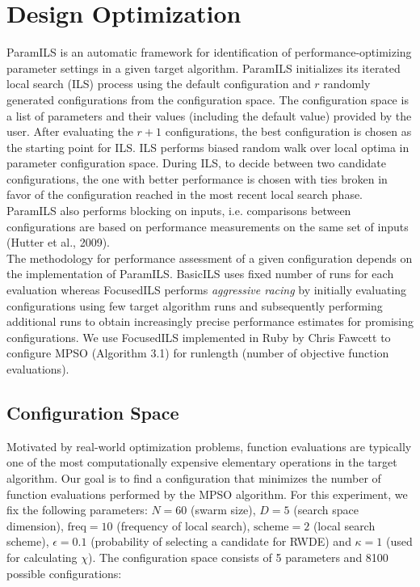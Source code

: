 \section{Design Optimization}

ParamILS is an automatic framework for identification of performance-optimizing parameter settings in a given target algorithm. ParamILS initializes its iterated local search (ILS) process using the default configuration and $r$ randomly generated configurations from the configuration space. The configuration space is a list of parameters and their values (including the default value) provided by the user. After evaluating the $r+1$ configurations, the best configuration is chosen as the starting point for ILS. ILS performs biased random walk over local optima in parameter configuration space. During ILS, to decide between two candidate configurations, the one with better performance is chosen with ties broken in favor of the configuration reached in the most recent local search phase. ParamILS also performs blocking on inputs, i.e. comparisons between configurations are based on performance measurements on the same set of inputs (Hutter et al., 2009).\\

The methodology for performance assessment of a given configuration depends on the implementation of ParamILS. BasicILS uses fixed number of runs for each evaluation whereas FocusedILS performs {\it aggressive racing} by initially evaluating configurations using few target algorithm runs and subsequently performing additional runs to obtain increasingly precise performance estimates for promising configurations. We use FocusedILS implemented in Ruby by Chris Fawcett to configure MPSO (Algorithm 3.1) for runlength (number of objective function evaluations).

\subsection{Configuration Space}

Motivated by real-world optimization problems, function evaluations are typically one of the most computationally expensive elementary operations in the target algorithm. Our goal is to find a configuration that minimizes the number of function evaluations performed by the MPSO algorithm. For this experiment, we fix the following parameters: $N=60$ (swarm size), $D=5$ (search space dimension), $\text{freq}=10$ (frequency of local search), $\text{scheme}=2$ (local search scheme), $\epsilon=0.1$ (probability of selecting a candidate for RWDE) and $\kappa=1$ (used for calculating $\chi$). The configuration space consists of 5 parameters and 8100 possible configurations:

